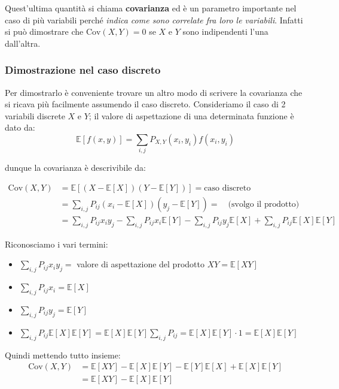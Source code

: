 \documentclass[openany,a4paper,12pt]{book}
\theoremstyle{remark}
\begin{document}
Quest'ultima quantità si chiama \textbf{covarianza} ed è un parametro importante nel caso di più variabili perché \textit{indica come sono correlate fra loro le variabili}. Infatti si può dimostrare che $\text{Cov}(X,Y) = 0$ se $X$ e $Y$ sono indipendenti l'una dall'altra.

\subsubsection*{Dimostrazione nel caso discreto}
Per dimostrarlo è conveniente trovare un altro modo di scrivere la covarianza che si ricava più facilmente assumendo il caso discreto.
Consideriamo il caso di 2 variabili discrete $X$ e $Y$; il valore di aspettazione di una determinata funzione è dato da: 
\[
\mathbb{E}[f(x,y)] = \sum_{i,j} P_{X,Y}(x_i,y_i)f(x_i,y_i)
\]

dunque la covarianza è descrivibile da:

\begin{align*}
    \text{Cov}(X,Y) &= \mathbb{E}\left[ (X - \mathbb{E}[X])(Y - \mathbb{E}[Y]) \right] = \text{caso discreto} \\
    &= \sum_{i,j} P_{ij} (x_i - \mathbb{E}[X])(y_j - \mathbb{E}[Y]) = \quad \text{(svolgo il prodotto)} \\
    &= \sum_{i,j} P_{ij} x_i y_j - \sum_{i,j} P_{ij} x_i \mathbb{E}[Y] - \sum_{i,j} P_{ij} y_j \mathbb{E}[X] + \sum_{i,j} P_{ij} \mathbb{E}[X]\mathbb{E}[Y]
\end{align*}

Riconosciamo i vari termini:
\begin{itemize}
    \item $\sum_{i,j} P_{ij} x_i y_j = $ valore di aspettazione del prodotto $XY = \mathbb{E}[XY]$
    \item $\sum_{i,j} P_{ij} x_i = \mathbb{E}[X]$
    \item $\sum_{i,j} P_{ij} y_j = \mathbb{E}[Y]$
    \item $\sum_{i,j} P_{ij} \mathbb{E}[X]\mathbb{E}[Y] = \mathbb{E}[X]\mathbb{E}[Y] \sum_{i,j} P_{ij} = \mathbb{E}[X]\mathbb{E}[Y] \cdot 1 = \mathbb{E}[X]\mathbb{E}[Y]$
\end{itemize}

Quindi mettendo tutto insieme:
\begin{align}
    \text{Cov}(X,Y) &= \mathbb{E}[XY] - \mathbb{E}[X]\mathbb{E}[Y] - \mathbb{E}[Y]\mathbb{E}[X] + \mathbb{E}[X]\mathbb{E}[Y] \nonumber \\
              &= \mathbb{E}[XY] - \mathbb{E}[X]\mathbb{E}[Y]
\end{align}
\end{document}

